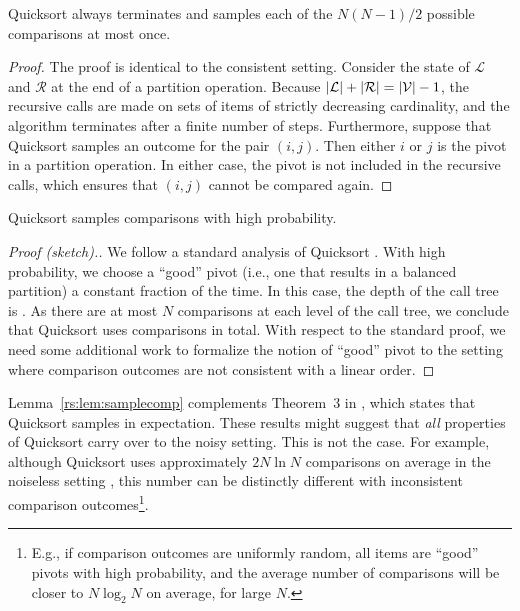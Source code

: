 \begin{lemma}
\label{rs:lem:termination}
Quicksort always terminates and samples each of the $N(N\!-\!1) / 2$ possible comparisons at most once.
\end{lemma}

\begin{proof}
The proof is identical to the consistent setting.
Consider the state of $\mathcal{L}$ and $\mathcal{R}$ at the end of a partition operation.
Because $\lvert\mathcal{L}\rvert + \lvert\mathcal{R}\rvert = \lvert\mathcal{V}\rvert - 1$, the recursive calls are made on sets of items of strictly decreasing cardinality, and the algorithm terminates after a finite number of steps.
Furthermore, suppose that Quicksort samples an outcome for the pair $(i, j)$.
Then either $i$ or $j$ is the pivot in a partition operation.
In either case, the pivot is not included in the recursive calls, which ensures that $(i, j)$ cannot be compared again.
\end{proof}

\begin{lemma}
\label{rs:lem:samplecomp}
Quicksort samples  comparisons with high probability.
\end{lemma}

\begin{proof}[Proof (sketch).]
We follow a standard analysis of Quicksort \citep[see, e.g.,][Section 3.3.3]{dubhashi2009concentration}.
With high probability, we choose a ``good'' pivot (i.e., one that results in a balanced partition) a constant fraction of the time.
In this case, the depth of the call tree is .
As there are at most $N$ comparisons at each level of the call tree, we conclude that Quicksort uses  comparisons in total.
With respect to the standard proof, we need some additional work to formalize the notion of ``good'' pivot to the setting where comparison outcomes are not consistent with a linear order.
\end{proof}

Lemma~\ref{rs:lem:samplecomp} complements Theorem~$3$ in \citet{ailon2010preference}, which states that Quicksort samples  in expectation.
These results might suggest that \emph{all} properties of Quicksort carry over to the noisy setting.
This is not the case.
For example, although Quicksort uses approximately $2N \ln N$ comparisons on average in the noiseless setting \citep{sedgewick2011algorithms}, this number can be distinctly different with inconsistent comparison outcomes\footnote{E.g., if comparison outcomes are uniformly random, all items are ``good'' pivots with high probability, and the average number of comparisons will be closer to $N \log_2 N$ on average, for large $N$.}.

